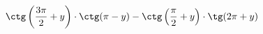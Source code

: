 \begin{ex}[type=expression]
	\begin{condition}
		\( \ctg\left( \dfrac{3\pi}{2}+y \right)\cdot\ctg(\pi-y)-\ctg\left( \dfrac{\pi}{2}+y \right)\cdot\tg(2\pi+y) \)
	\end{condition}
\end{ex}